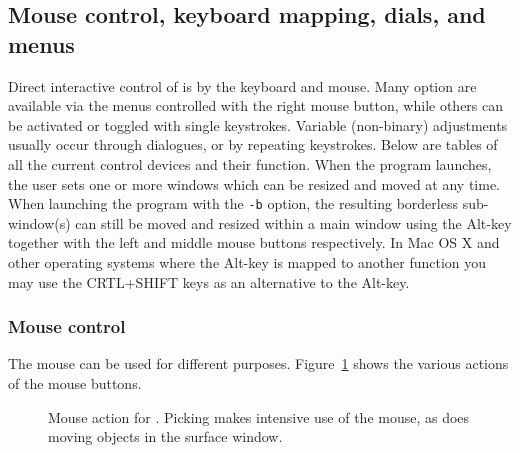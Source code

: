
\subsection{Mouse control, keyboard mapping, dials, and menus}
 
Direct interactive control of \map{} is by the keyboard and mouse.
Many option are available via the menus controlled with the right mouse
button, while others can be activated or toggled with single keystrokes.
Variable (non-binary) adjustments usually occur 
through dialogues, or by repeating keystrokes.  Below are tables of all the
current control devices and their function.  When the program launches, the
user sets one or more windows which can be resized and moved at any time.
When launching the program with the {\tt -b} option, the resulting
borderless sub-window(s) can still be moved and resized within a main
window using the Alt-key together with the left and middle mouse buttons
respectively.  In Mac OS X and other operating systems where the Alt-key is
mapped to another function you may use the CRTL+SHIFT keys as an
alternative to the Alt-key.


\subsubsection{Mouse control}
\label{sec:control-mouse} 

The mouse can be used for different purposes. Figure~\ref{fig:mouse} 
shows the various actions of the mouse
buttons. 

\begin{figure}[htb]
  \begin{makeimage}
  \end{makeimage}
  \mouseaction
  \caption{\label{fig:mouse} Mouse action for \map{}. Picking
  makes intensive use of the mouse, as does moving objects in the surface
  window.}
\end{figure}

